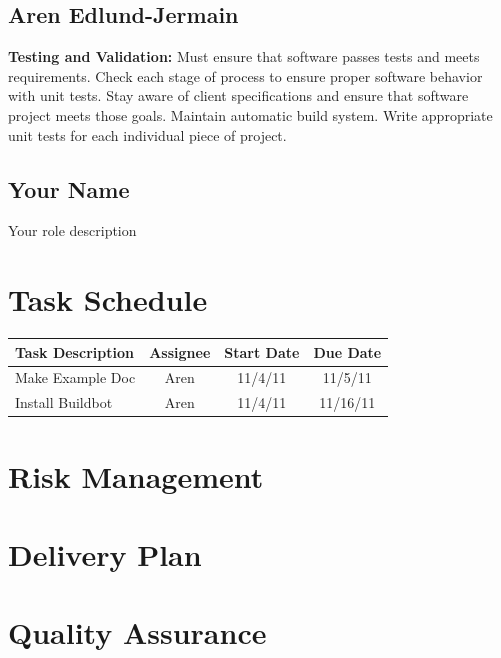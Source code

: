 \documentclass[12pt, letterpaper]{article}
\begin{document}
  \subsection{Aren Edlund-Jermain}
  {\bf Testing and Validation:} Must ensure that software passes tests and meets requirements. Check each stage of process to ensure proper software behavior with unit tests. Stay aware of client specifications and ensure that software project meets those goals. Maintain automatic build system. Write appropriate unit tests for each individual piece of project. 
  \subsection{Your Name}
  Your role description 

\section{Task Schedule}

\begin{center}
  \begin{tabular}{l || c | c | c | }
    Task Description & Assignee & Start Date & Due Date \\
    \hline
    Make Example Doc & Aren & 11/4/11 & 11/5/11 \\
    Install Buildbot & Aren & 11/4/11 & 11/16/11 \\
    \hline
  \end{tabular}
\end{center}

\section{Risk Management}

\section{Delivery Plan}

\section{Quality Assurance}
\end{document}

